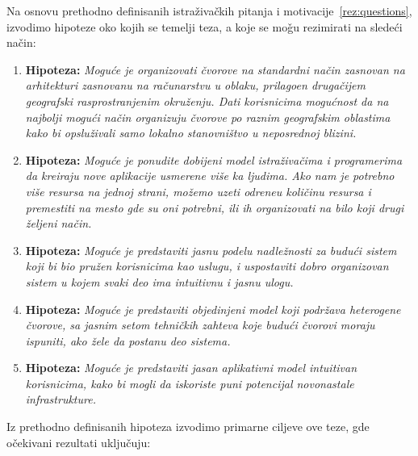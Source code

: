 Na osnovu prethodno definisanih istraživačkih pitanja i motivacije~\ref {rez:questions}, izvodimo hipoteze oko kojih se temelji teza, a koje se mo\v gu rezimirati na slede\'ci na\v cin:

\begin{enumerate}[start=1,label={(\bfseries \arabic*)}]
	\item \textbf{Hipoteza:} \textit{Mogu\'ce je organizovati \v cvorove na standardni na\v cin zasnovan na arhitekturi zasnovanu na ra\v cunarstvu u oblaku, prilago\dj en druga\v cijem geografski rasprostranjenim okruženju. Dati korisnicima mogu\'cnost da na najbolji mogu\'ci na\v cin organizuju \v cvorove po raznim geografskim oblastima kako bi opslu\v zivali samo lokalno stanovni\v stvo u neposrednoj blizini.}
	\item \textbf{Hipoteza:} \textit{Mogu\'ce je ponudite dobijeni model istra\v ziva\v cima i programerima da kreiraju nove aplikacije usmerene vi\v se ka ljudima. Ako nam je potrebno vi\v se resursa na jednoj strani, mo\v zemo uzeti odre\dj neu koli\v cinu resursa i premestiti na mesto gde su oni potrebni, ili ih organizovati na bilo koji drugi \v zeljeni na\v cin.}
	\item \textbf{Hipoteza:} \textit{Mogu\'ce je predstaviti jasnu podelu nadle\v znosti za budu\'ci sistem koji bi bio pru\v zen korisnicima kao uslugu, i uspostaviti dobro organizovan sistem u kojem svaki deo ima intuitivnu i jasnu ulogu.}
	\item \textbf{Hipoteza:} \textit{Mogu\'ce je predstaviti objedinjeni model koji podr\v zava heterogene \v cvorove, sa jasnim setom tehni\v ckih zahteva koje budu\'ci \v cvorovi moraju ispuniti, ako \v zele da postanu deo sistema.}
	\item \textbf{Hipoteza:} \textit{Mogu\'ce je predstaviti jasan aplikativni model intuitivan korisnicima, kako bi mogli da iskoriste puni potencijal novonastale infrastrukture.}
\end{enumerate}

Iz prethodno definisanih hipoteza izvodimo primarne ciljeve ove teze, gde o\v cekivani rezultati uklju\v cuju:

